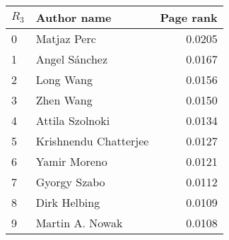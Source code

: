 \begin{tabular}{llr}
\toprule
\(R_3\) &            Author name &  Page rank \\
\midrule
0 &            Matjaz Perc &              0.0205 \\
1 &          Angel Sánchez &              0.0167 \\
2 &              Long Wang &              0.0156 \\
3 &              Zhen Wang &              0.0150 \\
4 &        Attila Szolnoki &              0.0134 \\
5 &  Krishnendu Chatterjee &              0.0127 \\
6 &           Yamir Moreno &              0.0121 \\
7 &           Gyorgy Szabo &              0.0112 \\
8 &           Dirk Helbing &              0.0109 \\
9 &        Martin A. Nowak &              0.0108 \\
\bottomrule
\end{tabular}

